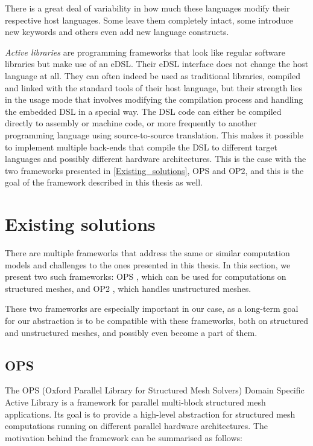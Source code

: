 \documentclass[fontsize=11pt, appendixprefix=true]{scrreprt}
\begin{document}
There is a great deal of variability in how much these languages modify their
respective host languages. Some leave them completely intact, some introduce new
keywords and others even add new language constructs.

\textit{Active libraries} are programming frameworks that look like regular
software libraries but make use of an eDSL. Their eDSL interface does not change
the host language at all. They can often indeed be used as traditional
libraries, compiled and linked with the standard tools of their host language,
but their strength lies in the usage mode that involves modifying the
compilation process and handling the embedded DSL in a special way. The DSL code
can either be compiled directly to assembly or machine code, or more frequently
to another programming language using source-to-source translation. This makes
it possible to implement multiple back-ends that compile the DSL to different
target languages and possibly different hardware architectures. This is the case
with the two frameworks presented in \autoref{Existing_solutions}, OPS and OP2,
and this is the goal of the framework described in this thesis as well.

\section{Existing solutions}
\label{Existing_solutions}

There are multiple frameworks that address the same or similar computation
models and challenges to the ones presented in this thesis. In this section, we
present two such frameworks: OPS \cite{OPS}, which can be used for computations
on structured meshes, and OP2 \cite{OP2}, which handles unstructured meshes.

These two frameworks are especially important in our case, as a long-term goal
for our abstraction is to be compatible with these frameworks, both on
structured and unstructured meshes, and possibly even become a part of them.

\subsection{OPS}

The OPS (Oxford Parallel Library for Structured Mesh Solvers) Domain Specific
Active Library is a framework for parallel multi-block structured mesh
applications. Its goal is to provide a high-level abstraction for structured
mesh computations running on different parallel hardware architectures. The
motivation behind the framework can be summarised as follows:
\end{document}
